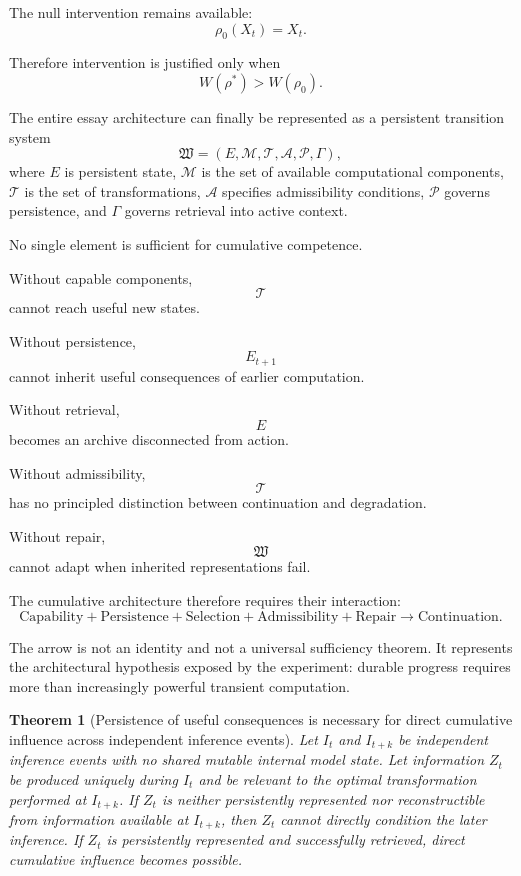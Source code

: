 \documentclass[11pt]{article}
\newtheorem{theorem}[definition]{Theorem}
\begin{document}
The null intervention remains available:
\[
    \rho_0(X_t)=X_t.
\]

Therefore intervention is justified only when
\[
    W(\rho^\ast)
    >
    W(\rho_0).
\]

The entire essay architecture can finally be represented as a persistent transition system
\[
    \mathfrak{W}
    =
    (E,\mathcal{M},\mathcal{T},\mathcal{A},\mathcal{P},\Gamma),
\]
where \(E\) is persistent state, \(\mathcal{M}\) is the set of available computational components, \(\mathcal{T}\) is the set of transformations, \(\mathcal{A}\) specifies admissibility conditions, \(\mathcal{P}\) governs persistence, and \(\Gamma\) governs retrieval into active context.

No single element is sufficient for cumulative competence.

Without capable components,
\[
    \mathcal{T}
\]
cannot reach useful new states.

Without persistence,
\[
    E_{t+1}
\]
cannot inherit useful consequences of earlier computation.

Without retrieval,
\[
    E
\]
becomes an archive disconnected from action.

Without admissibility,
\[
    \mathcal{T}
\]
has no principled distinction between continuation and degradation.

Without repair,
\[
    \mathfrak{W}
\]
cannot adapt when inherited representations fail.

The cumulative architecture therefore requires their interaction:
\[
    \boxed{
    \text{Capability}
    +
    \text{Persistence}
    +
    \text{Selection}
    +
    \text{Admissibility}
    +
    \text{Repair}
    \longrightarrow
    \text{Continuation}.
    }
\]

The arrow is not an identity and not a universal sufficiency theorem. It represents the architectural hypothesis exposed by the experiment: durable progress requires more than increasingly powerful transient computation.

\begin{theorem}[Persistence of useful consequences is necessary for direct cumulative influence across independent inference events]
Let \(I_t\) and \(I_{t+k}\) be independent inference events with no shared mutable internal model state. Let information \(Z_t\) be produced uniquely during \(I_t\) and be relevant to the optimal transformation performed at \(I_{t+k}\). If \(Z_t\) is neither persistently represented nor reconstructible from information available at \(I_{t+k}\), then \(Z_t\) cannot directly condition the later inference. If \(Z_t\) is persistently represented and successfully retrieved, direct cumulative influence becomes possible.
\end{theorem}
\end{document}
